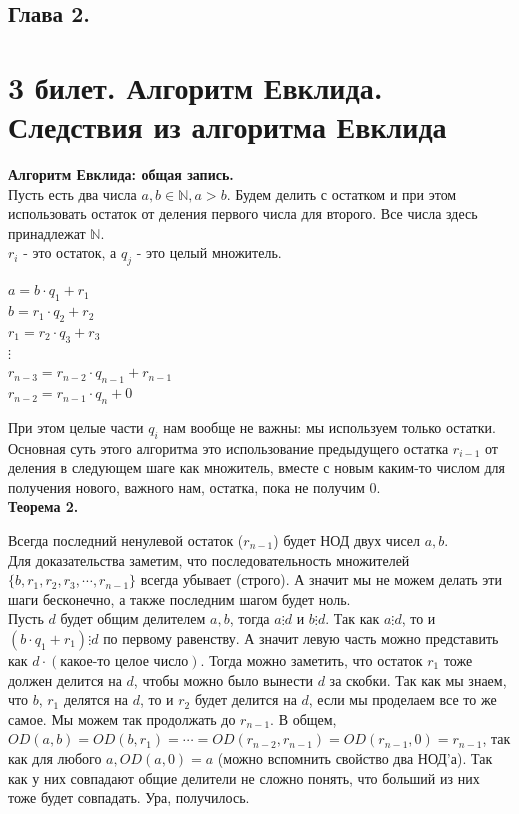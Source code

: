 \documentclass[a4paper, 12pt]{article}
\begin{document}
\begin{center}
	\section*{Глава 2.}
\end{center}

\section*{3 билет. Алгоритм Евклида. Следствия из алгоритма Евклида}

\textbf{Алгоритм Евклида: общая запись.}\\

Пусть есть два числа $a,b \in \mathbb{N}, a > b$. Будем делить с остатком и при этом использовать остаток от деления первого числа для второго. Все числа здесь принадлежат $\mathbb{N}$. 
\\$r_{i}$ - это остаток, а $q_{j}$ - это целый множитель.

\begin{center}
	$a = b \cdot q_1 + r_1$\\
	$b = r_1 \cdot q_2 + r_2$\\
	$r_1 = r_2 \cdot q_3 + r_3$\\
	$\vdots$\\
	$r_{n-3} = r_{n-2} \cdot q_{n-1} + r_{n-1}$\\
	$r_{n-2} = r_{n-1} \cdot q_n + 0$\\
\end{center}

При этом целые части $q_i$ нам вообще не важны: мы используем только остатки. Основная суть этого алгоритма это использование предыдущего остатка $r_{i-1}$ от деления в следующем шаге как множитель, вместе с новым каким-то числом для получения нового, важного нам, остатка, пока не получим 0.\\

\textbf{Теорема 2.}	

Всегда последний ненулевой остаток ($r_{n-1}$) будет НОД двух чисел $a, b$.\\

Для доказательства заметим, что последовательность множителей $\{b, r_1, r_2, r_3, \cdots, r_{n-1}\}$ всегда убывает (строго). А значит мы не можем делать эти шаги бесконечно, а также последним шагом будет ноль.\\

Пусть $d$ будет общим делителем $a,b$, тогда $a \vdots d$ и $b \vdots d$. Так как $a \vdots d$, то и $(b \cdot q_1 + r_1) \vdots d$ по первому равенству. А значит левую часть можно представить как $d \cdot(\text{какое-то целое число})$. Тогда можно заметить, что остаток $r_1$ тоже должен делится на $d$, чтобы можно было вынести $d$ за скобки. Так как мы знаем, что $b$, $r_1$ делятся на $d$, то и $r_2$ будет делится на $d$, если мы проделаем все то же самое. Мы можем так продолжать до $r_{n-1}$. В общем, $OD(a,b) = OD(b,r_1) = \cdots = OD(r_{n-2}, r_{n-1}) = OD(r_{n-1}, 0) = r_{n-1}$, так как для любого $a, OD(a, 0) = a$ (можно вспомнить свойство два НОД'а). Так как у них совпадают общие делители не сложно понять, что больший из них тоже будет совпадать. Ура, получилось.\\
\end{document}
